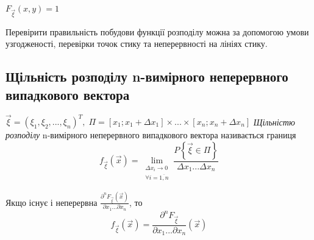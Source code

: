 \begin{example}
\begin{enumerate}
\begin{enumerate}[label=(\Roman*)]
            $F_{\vec{\xi}}(x, y) = 1$
        \end{enumerate}
    \end{enumerate}
\end{example}

\begin{remark}
    Перевірити правильність побудови функції розподілу можна за допомогою 
    умови узгодженості, перевірки точок стику та неперервності на лініях стику.
\end{remark}

\subsection{Щільність розподілу n-вимірного неперервного випадкового 
вектора}
\begin{definition}
    $\vec{\xi} = \left(\xi_1, \xi_2, ..., \xi_n\right)^T,\; \Pi = 
    \left[x_1; x_1+\Delta x_1\right] \times ... \times 
    \left[x_n; x_n+\Delta x_n\right]$
    \emph{Щільністю розподілу} n-вимірного неперервного випадкового 
    вектора називається границя
    \begin{equation*}
        f_{\vec{\xi}} (\vec{x}) = \lim_{\substack{\Delta x_i \to 0 \\
        \forall i = \overline{1,n}}} 
        \frac{P\left\{\vec{\xi} \in \Pi\right\}}{\Delta x_1...\Delta x_n}
    \end{equation*}

    Якщо існує і неперервна $\frac{\partial^n F_{\vec{\xi}}(\vec{x})}
    {\partial x_1 ... \partial x_n}$, то
    \begin{equation*}
        f_{\vec{\xi}} (\vec{x}) = \frac{\partial^n F_{\vec{\xi}}}
        {\partial x_1 ... \partial x_n}(\vec{x})
    \end{equation*}
\end{definition}

